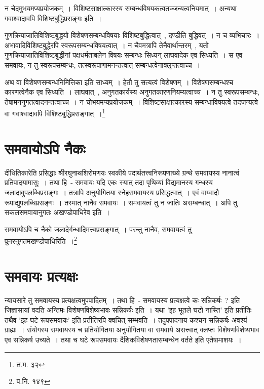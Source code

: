 	न चेदमुभयमप्यप्रयोजकम्~। विशिष्टसाक्षात्कारस्य सम्बन्धविषयकत्वतज्जन्यत्वनियमात्~। अन्यथा गवाश्वादावपि विशिष्टबुद्धिप्रसङ्गः इति~।

	{\fontsize{11.7}{0}\selectfont\s  गुणक्रियाजातिविशिष्टबुद्धयो विशेषणसम्बन्धविषयाः विशिष्टबुद्धित्वात्~, दण्डीति बुद्धिवत्~। न च व्यभिचारः~। अभावादिविशिष्टबुद्धेरपि स्वरूपसम्बन्धविषयत्वात्~। न चैवमत्रापि तेनैवार्थान्तरम्~, यतो गुणक्रियाजातिविशिष्टबुद्धीनां पक्षधर्मताबलेन विषयः सम्बन्धः सिध्यन् लाघवादेक एव सिध्यति~। स एव समवायः, न तु स्वरूपसम्बन्धः, तत्स्वरूपाणामनन्तत्वात् सम्बन्धत्वेनाक्लृप्तत्वाच्च~।}

	{\fontsize{11.7}{0}\selectfont\s   अथ वा विशेषणसम्बन्धनिमित्तिका इति साध्यम्~। हेतौ तु सत्यत्वं विशेषणम्~। विशेषणसम्बन्धश्च कारणत्वेनैक एव सिध्यति~। लाघवात्~, अनुगतकार्यस्य अनुगतकारणनियम्यत्वाच्च~। न तु स्वरूपसम्बन्धः, तेषामननुगतत्वादनन्तत्वाच्च~। न चोभयमप्यप्रयोजकम्~। विशिष्टसाक्षात्कारस्य सम्बन्धाविषयत्वे तदजन्यत्वे वा गवाश्वादावपि विशिष्टबुद्धिप्रसङ्गात्~।\footnote{त.म. ३२}}


	\section{समवायोऽपि नैकः} 

	दीधितिकारेति प्रसिद्धाः श्रीरघुनाथशिरोमणयः स्वकीये पदार्थतत्त्वनिरूपणाख्ये ग्रन्थे समवायस्य नानात्वं प्रतिपादयामासुः~। तथा हि~- समवायः यदि एकः स्यात् तदा पृथिव्यां विद्यमानस्य गन्धस्य जलादावुपलब्धिप्रसङ्गः~। तत्रापि अनुयोगितया स्नेहसमवायस्य प्रसिद्धत्वात्~। एवं वाय्वादौ रूपाद्युपलब्धिप्रसङ्गः~। तस्मात् नानैव समवायः~। समवायत्वं तु न जातिः असम्बन्धात्~। अपि तु सकलसमवायानुगतः अखण्डोपाधिरेव इति~।

	{\fontsize{11.7}{0}\selectfont\s समवायोऽपि च नैको जलादेर्गन्धादिमत्त्वप्रसङ्गात्~। परन्तु नानैव, समवायत्वं तु पुनरनुगतमखण्डोपाधिरिति~।\footnote{प.नि. १४९}}


	\section{समवायः प्रत्यक्षः} 

	न्यायसारे तु समवायस्य प्रत्यक्षत्वमुपपादितम्~। तथा हि~- समवायस्य प्रत्यक्षत्वे कः सन्निकर्षः~? इति जिज्ञासायां वदति अन्तिमः विशेषणविशेष्यभावः सन्निकर्षः इति~। यथा 'इह भूतले घटो नास्ति' इति प्रतीतिः तथैव 'इह घटे रूपसमवायः' इति प्रतीतिरपि क्वचित् सम्भवति~। तदुपपादनाय कश्चन सन्निकर्षः अवश्यं ग्राह्यः~। संयोगस्य समवायस्य च प्रतियोगितया अनुयोगितया वा समवाये असत्त्वात् क्लप्तः विशेषणविशेष्यभाव एव सन्निकर्ष उच्यते~। तथा च घटे रूपसमवायः दैशिकविशेषणतासम्बन्धेन वर्तते इति एतेषामाशयः~।

